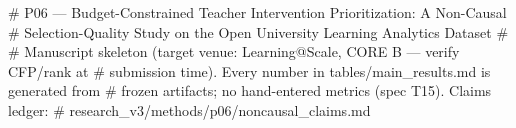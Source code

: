 # P06 — Budget-Constrained Teacher Intervention Prioritization: A Non-Causal
# Selection-Quality Study on the Open University Learning Analytics Dataset
#
# Manuscript skeleton (target venue: Learning@Scale, CORE B — verify CFP/rank at
# submission time). Every number in tables/main_results.md is generated from
# frozen artifacts; no hand-entered metrics (spec T15). Claims ledger:
# research_v3/methods/p06/noncausal_claims.md
